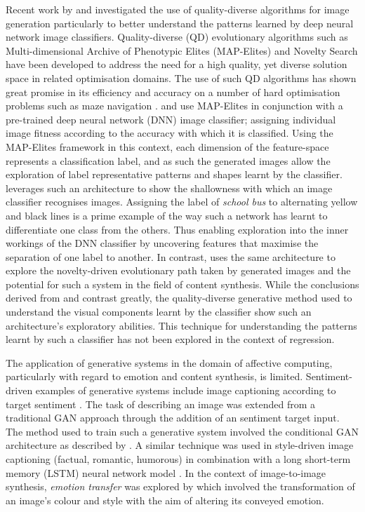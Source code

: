 \documentclass{article}
\begin{document}
Recent work by \citet{nguyen2015innovation} and \citet{nguyen2015deep} investigated the use of quality-diverse algorithms for image generation particularly to better understand the patterns learned by deep neural network image classifiers.
Quality-diverse (QD) evolutionary algorithms such as Multi-dimensional Archive of Phenotypic Elites (MAP-Elites) \citep{mouret2015illuminating} and Novelty Search \citep{lehman2008exploiting, lehman2011abandoning} have been developed to address the need for a high quality, yet diverse solution space in related optimisation domains.
The use of such QD algorithms has shown great promise in its efficiency and accuracy on a number of hard optimisation problems \citep{pugh2016quality} such as maze navigation \citep{lehman2011abandoning}.
\citet{nguyen2015deep} and \citet{nguyen2015innovation} use MAP-Elites in conjunction with a pre-trained deep neural network (DNN) image classifier; assigning individual image fitness according to the accuracy with which it is classified.
Using the MAP-Elites framework in this context, each dimension of the feature-space represents a classification label, and as such the generated images allow the exploration of label representative patterns and shapes learnt by the classifier.
\citet{nguyen2015deep} leverages such an architecture to show the shallowness with which an image classifier recognises images.
Assigning the label of \textit{school bus} to alternating yellow and black lines is a prime example of the way such a network has learnt to differentiate one class from the others.
Thus enabling exploration into the inner workings of the DNN classifier by uncovering features that maximise the separation of one label to another.
In contrast, \citet{nguyen2015innovation} uses the same architecture to explore the novelty-driven evolutionary path taken by generated images and the potential for such a system in the field of content synthesis.
While the conclusions derived from \citet{nguyen2015innovation} and \citet{nguyen2015deep} contrast greatly, the quality-diverse generative method used to understand the visual components learnt by the classifier show such an architecture's exploratory abilities.
This technique for understanding the patterns learnt by such a classifier has not been explored in the context of regression.

The application of generative systems in the domain of affective computing, particularly with regard to emotion and content synthesis, is limited.
Sentiment-driven examples of generative systems include image captioning according to target sentiment \citep{mathews2016senticap}.
The task of describing an image was extended from a traditional GAN approach through the addition of an sentiment target input.
The method used to train such a generative system involved the conditional GAN architecture as described by \citet{gauthier2014conditional}.
A similar technique was used in style-driven image captioning (factual, romantic, humorous) in combination with a long short-term memory (LSTM) neural network model \citet{gan2017stylenet}.
In the context of image-to-image synthesis, \textit{emotion transfer} was explored by \citet{ali2017emotional} which involved the transformation of an image's colour and style with the aim of altering its conveyed emotion.
\end{document}
